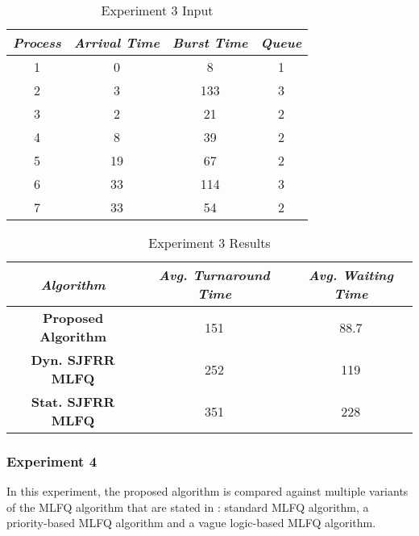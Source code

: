 \documentclass[conference]{IEEEtran}
\newcommand\T{\rule{0pt}{2.6ex}}       %
\newcommand\B{\rule[-1.2ex]{0pt}{0pt}} %
\begin{document}
\begin{table}[H]
    \caption{Experiment 3 Input}
    \centering
     \begin{tabular}{||c c c c||} 
     \hline
     \textit{\textbf{Process}} & \textit{\textbf{Arrival Time}} & \textit{\textbf{Burst Time}} & \textit{\textbf{Queue}} \T \B \\ 
     \hline
     \hline
     1 & 0 & 8 & 1 \T \B \\ 
     \hline
     2 & 3 & 133 & 3 \T \B \\
     \hline
     3 & 2 & 21 & 2 \T \B \\
     \hline
     4 & 8 & 39 & 2 \T \B \\
     \hline
     5 & 19 & 67 & 2 \T \B \\ 
     \hline
     6 & 33 & 114 & 3 \T \B \\ 
     \hline
     7 & 33 & 54 & 2 \T \B \\ 
     \hline
     \end{tabular}
\end{table}

\begin{table}[H]
    \caption{Experiment 3 Results}
    \centering
    \begin{tabular}{||c c c||}
        \hline
        \textit{\textbf{Algorithm}} & \textit{\textbf{Avg. Turnaround Time}} & \textit{\textbf{Avg. Waiting Time}}\T \B \\
    \hline
    \hline
    \textbf{Proposed Algorithm} & 151 & 88.7 \T \B\\ \hline
    \textbf{Dyn. SJFRR MLFQ} & 252 & 119 \T \B\\ \hline
    \textbf{Stat. SJFRR MLFQ} & 351 & 228 \T \B\\ \hline
     \end{tabular}
\end{table}

\subsubsection{Experiment 4}

In this experiment, the proposed algorithm is compared against multiple variants of the MLFQ algorithm that are stated in \cite{b6}: standard MLFQ algorithm, a priority-based MLFQ algorithm and a vague logic-based MLFQ algorithm.
\end{document}
